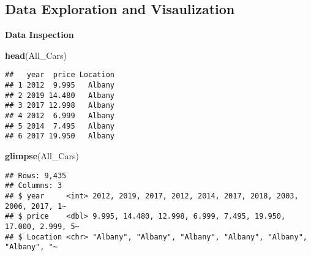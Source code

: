 \documentclass[
]{article}
\newenvironment{Shaded}{\begin{snugshade}}{\end{snugshade}}
\newcommand{\AttributeTok}[1]{\textcolor[rgb]{0.13,0.29,0.53}{#1}}
\newcommand{\CommentTok}[1]{\textcolor[rgb]{0.56,0.35,0.01}{\textit{#1}}}
\newcommand{\FunctionTok}[1]{\textcolor[rgb]{0.13,0.29,0.53}{\textbf{#1}}}
\newcommand{\NormalTok}[1]{#1}
\newcommand{\OtherTok}[1]{\textcolor[rgb]{0.56,0.35,0.01}{#1}}
\newcommand{\SpecialCharTok}[1]{\textcolor[rgb]{0.81,0.36,0.00}{\textbf{#1}}}
\newcommand{\StringTok}[1]{\textcolor[rgb]{0.31,0.60,0.02}{#1}}
\begin{document}
\begin{Shaded}
\end{Shaded}

\hypertarget{data-exploration-and-visaulization}{%
\subsection{Data Exploration and
Visaulization}\label{data-exploration-and-visaulization}}

\textbf{Data Inspection}

\begin{Shaded}
\begin{Highlighting}[]
\FunctionTok{head}\NormalTok{(All\_Cars)}
\end{Highlighting}
\end{Shaded}

\begin{verbatim}
##   year  price Location
## 1 2012  9.995   Albany
## 2 2019 14.480   Albany
## 3 2017 12.998   Albany
## 4 2012  6.999   Albany
## 5 2014  7.495   Albany
## 6 2017 19.950   Albany
\end{verbatim}

\begin{Shaded}
\begin{Highlighting}[]
\FunctionTok{glimpse}\NormalTok{(All\_Cars)}
\end{Highlighting}
\end{Shaded}

\begin{verbatim}
## Rows: 9,435
## Columns: 3
## $ year     <int> 2012, 2019, 2017, 2012, 2014, 2017, 2018, 2003, 2006, 2017, 1~
## $ price    <dbl> 9.995, 14.480, 12.998, 6.999, 7.495, 19.950, 17.000, 2.999, 5~
## $ Location <chr> "Albany", "Albany", "Albany", "Albany", "Albany", "Albany", "~
\end{verbatim}
\end{document}
